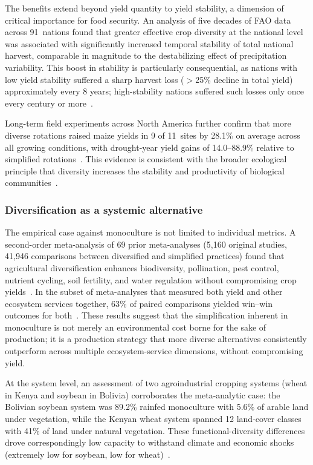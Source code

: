 The benefits extend beyond yield quantity to yield stability, a dimension of critical importance for food security. An analysis of five decades of FAO data across 91~nations found that greater effective crop diversity at the national level was associated with significantly increased temporal stability of total national harvest, comparable in magnitude to the destabilizing effect of precipitation variability. This boost in stability is particularly consequential, as nations with low yield stability suffered a sharp harvest loss (${>}$25\% decline in total yield) approximately every 8 years; high-stability nations suffered such losses only once every century or more~\cite[Abstract,~Fig.~2]{renard2019national}.

Long-term field experiments across North America further confirm that more diverse rotations raised maize yields in 9 of 11~sites by 28.1\% on average across all growing conditions, with drought-year yield gains of 14.0--88.9\% relative to simplified rotations~\cite[Figs.~1A,~2B]{bowles2020longterm}. This evidence is consistent with the broader ecological principle that diversity increases the stability and productivity of biological communities~\cite[pp.~60--61]{cardinale2012biodiversity}.

\subsubsection{Diversification as a systemic alternative}
The empirical case against monoculture is not limited to individual metrics. A second-order meta-analysis of 69 prior meta-analyses (5,160 original studies, 41,946 comparisons between diversified and simplified practices) found that agricultural diversification enhances biodiversity, pollination, pest control, nutrient cycling, soil fertility, and water regulation without compromising crop yields~\cite[Abstract,~Fig.~2]{tamburini2020diversification}. In the subset of meta-analyses that measured both yield and other ecosystem services together, 63\% of paired comparisons yielded win--win outcomes for both~\cite[Fig.~3]{tamburini2020diversification}. These results suggest that the simplification inherent in monoculture is not merely an environmental cost borne for the sake of production; it is a production strategy that more diverse alternatives consistently outperform across multiple ecosystem-service dimensions, without compromising yield.

At the system level, an assessment of two agroindustrial cropping systems (wheat in Kenya and soybean in Bolivia) corroborates the meta-analytic case: the Bolivian soybean system was 89.2\% rainfed monoculture with 5.6\% of arable land under vegetation, while the Kenyan wheat system spanned 12 land-cover classes with 41\% of land under natural vegetation. These functional-diversity differences drove correspondingly low capacity to withstand climate and economic shocks (extremely low for soybean, low for wheat)~\cite[Abstract,~p.~7]{mukhovi2022monocultures}.

